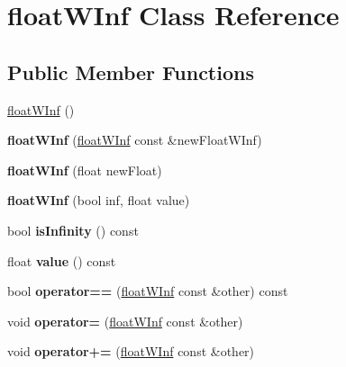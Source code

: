\hypertarget{classfloatWInf}{
\section{floatWInf Class Reference}
\label{classfloatWInf}
}
\subsection*{Public Member Functions}
\begin{DoxyCompactItemize}
\item 
\hyperlink{classfloatWInf_af09b6d2b72f1fb322cd9081a4f56f99b}{floatWInf} ()
\item 
\hypertarget{classfloatWInf_a64ffe9b902b194cdde9fbc9fef4d9fa8}{
{\bfseries floatWInf} (\hyperlink{classfloatWInf}{floatWInf} const \&newFloatWInf)}
\label{classfloatWInf_a64ffe9b902b194cdde9fbc9fef4d9fa8}

\item 
\hypertarget{classfloatWInf_adb9290ce32cc7767f046d84b8567fbec}{
{\bfseries floatWInf} (float newFloat)}
\label{classfloatWInf_adb9290ce32cc7767f046d84b8567fbec}

\item 
\hypertarget{classfloatWInf_abd59af5f777a06067f62c478c38144f3}{
{\bfseries floatWInf} (bool inf, float value)}
\label{classfloatWInf_abd59af5f777a06067f62c478c38144f3}

\item 
\hypertarget{classfloatWInf_af6ee0f0f2c383e14c7ee6af8d2704b44}{
bool {\bfseries isInfinity} () const }
\label{classfloatWInf_af6ee0f0f2c383e14c7ee6af8d2704b44}

\item 
\hypertarget{classfloatWInf_aad23dc5cd4d03de00a17e1362cde6e2b}{
float {\bfseries value} () const }
\label{classfloatWInf_aad23dc5cd4d03de00a17e1362cde6e2b}

\item 
\hypertarget{classfloatWInf_aff8d48cdf673cf61e11892f019aca46c}{
bool {\bfseries operator==} (\hyperlink{classfloatWInf}{floatWInf} const \&other) const }
\label{classfloatWInf_aff8d48cdf673cf61e11892f019aca46c}

\item 
\hypertarget{classfloatWInf_a225a26bbf760fd2118da91dadd925605}{
void {\bfseries operator=} (\hyperlink{classfloatWInf}{floatWInf} const \&other)}
\label{classfloatWInf_a225a26bbf760fd2118da91dadd925605}

\item 
\hypertarget{classfloatWInf_ab85d7a34c0ff8c849844216bbbfb6553}{
void {\bfseries operator+=} (\hyperlink{classfloatWInf}{floatWInf} const \&other)}
\label{classfloatWInf_ab85d7a34c0ff8c849844216bbbfb6553}


\end{DoxyCompactItemize}
